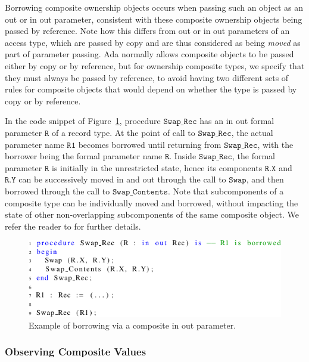 \documentclass[runningheads]{llncs}
\newcommand\var[1]{\ensuremath{\mathtt{#1}}}
\newcommand{\keyword}[1]{\textsf{#1}}
\begin{document}
Borrowing composite ownership objects occurs when passing such an object as an \keyword{out} or \keyword{in out} parameter, consistent with
these composite ownership objects being passed by reference. Note how this differs from \keyword{out} or \keyword{in out} parameters of an access type, which are passed by copy
and are thus considered as being \textit{moved} as part of parameter passing. Ada normally allows composite objects to be passed either by copy or by reference, but for ownership composite types, we specify that they must always be passed by reference, to avoid having two different sets of rules for composite objects that would depend on whether the type is passed by copy or by reference.

In the code snippet of Figure~\ref{fig:borrowingComposite}, procedure \var{Swap\_Rec} has an \keyword{in out} formal parameter \var{R} of a record type. At the point of
call to \var{Swap\_Rec}, the actual parameter name \var{R1} becomes borrowed until returning from \var{Swap\_Rec}, with the borrower being the formal parameter name \var{R}.  Inside \var{Swap\_Rec}, the formal parameter \var{R} is initially
in the unrestricted state, hence its components \var{R.X} and \var{R.Y} can be successively moved in and out through the call to \var{Swap}, and then borrowed through the call to \var{Swap\_Contents}.
Note that subcomponents of a composite type can be individually moved and borrowed, without impacting the state of other non-overlapping subcomponents of the same composite object.
We refer the reader to \cite{AI2018} for further details.

\begin{figure}[htb!]
\centering
   \includegraphics[]{borrowingComposite}
   \caption{Example of borrowing via a composite \keyword{in out} parameter.}
   \label{fig:borrowingComposite}
\end{figure}


\subsubsection{Observing Composite Values}
\label{subsubsec:extendingBorrowing}
\end{document}
